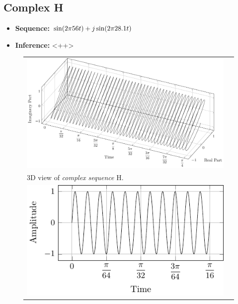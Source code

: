 \documentclass[../../course]{subfiles}
\begin{document}
\subsection{Complex H}

\begin{itemize} [label=]

    \item \textbf{Sequence:} $\sin(2 \pi 56 t) + j \sin(2 \pi 28.1 t)$

    \item \textbf{Inference:} <++>

\end{itemize}

\begin{figure} [H]

    \renewcommand{\arraystretch}{0.75}
    \centering
    \begin{NiceTabularX} {\textwidth} {
            *{2}{>{\centering\arraybackslash}X}
        }

         {
             {
                \includegraphics[height = \textheight] {tikzpics/plotComplexH.pdf}
            }
        }

        &
        \\

         {
            \vbox{
                 {3D view of \emph{complex sequence} H.}
                \label{plt:cmplxH}
            }
        }

        &
        \\

         {
             {
                \includegraphics[height = \textheight] {tikzpics/plotShortX3.pdf}
            }
        }


\end{NiceTabularX}
\end{figure}
\end{document}

